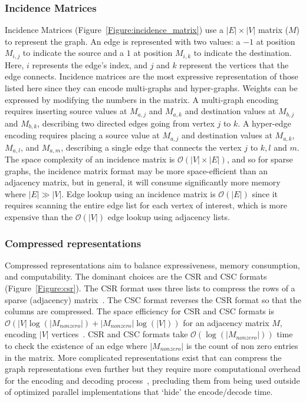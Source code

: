 

\subsubsection{Incidence Matrices}
Incidence Matrices (Figure~\ref{Figure:incidence_matrix}) use a $|E|\times|V|$ matrix ($M$) to represent the graph. 
An edge is represented with two values: a $-1$ at position $M_{i,j}$ to indicate the source and a $1$ at position $M_{i,k}$ to indicate the destination.
Here, $i$ represents the edge's index, and $j$ and $k$ represent the vertices that the edge connects.
Incidence matrices are the most expressive representation of those listed here since they can encode multi-graphs and hyper-graphs.
Weights can be expressed by modifying the numbers in the matrix. 
A multi-graph encoding requires inserting source values at $M_{a,j}$ and $M_{a,k}$ and destination values at $M_{b,j}$ and $M_{b,k}$, describing two directed edges going from vertex $j$ to $k$. 
A hyper-edge encoding requires placing a source value at $M_{a,j}$ and destination values at $M_{a,k}$, $M_{a,l}$, and $M_{a,m}$, describing a single edge that connects the vertex $j$ to $k,l$ and $m$.
The space complexity of an incidence matrix is $\mathcal{O}(|V|\times|E|)$, and so for sparse graphs, the incidence matrix format may be more space-efficient than an adjacency matrix, but in general, it will consume significantly more memory where $|E|\gg|V|$. 
Edge lookup using an incidence matrix is $\mathcal{O}(|E|)$ since it requires scanning the entire edge list for each vertex of interest, which is more expensive than the $\mathcal{O}(|V|)$ edge lookup using adjacency lists.



\subsubsection{Compressed representations}
Compressed representations aim to balance expressiveness, memory consumption, and computability. 
The dominant choices are the \ac{CSR} and \ac{CSC} formats (Figure~\ref{Figure:csr}).
The \ac{CSR} format uses three lists to compress the rows of a sparse (adjacency) matrix~\cite{Bulucc2009}. 
The \ac{CSC} format reverses the \ac{CSR} format so that the columns are compressed.
The space efficiency for \ac{CSR} and \ac{CSC} formats is $\mathcal{O}(|V|\log(|M_{nonzero}|)+|M_{nonzero}|\log(|V|))$ for an adjacency matrix $M$, encoding $|V|$ vertices~\cite{Bulucc2009}.
\ac{CSR} and \ac{CSC} formats take $\mathcal{O}(\log(|M_{nonzero}|))$ time to check the existence of an edge where $|M_{nonzero}|$ is the count of non zero entries in the matrix. 
More complicated representations exist that can compress the graph representations even further but they require more computational overhead for the encoding and decoding process~\cite{Shun2015}, precluding them from being used outside of optimized parallel implementations that `hide' the encode/decode time.

